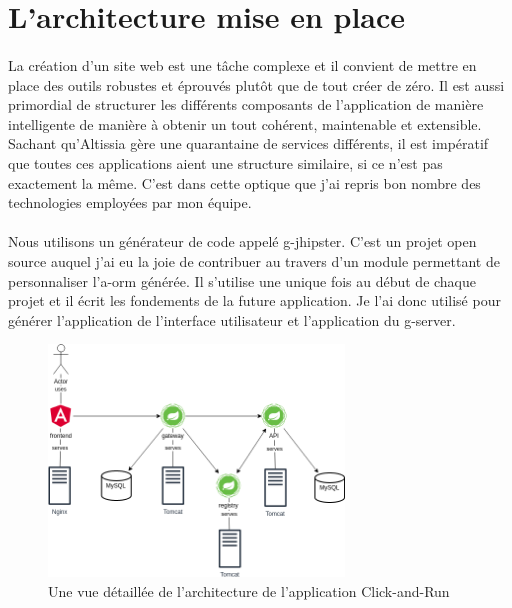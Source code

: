 \section{L'architecture mise en place}
\label{sec:architecture}

\paragraph{}
La création d'un site web est une tâche complexe et il convient de mettre en place des outils robustes et éprouvés plutôt que de tout créer de zéro.
Il est aussi primordial de structurer les différents composants de l'application de manière intelligente de manière à obtenir un tout cohérent, maintenable et extensible.
Sachant qu’Altissia gère une quarantaine de services différents, il est impératif que toutes ces applications aient une structure similaire, si ce n'est pas exactement la même.
C'est dans cette optique que j'ai repris bon nombre des technologies employées par mon équipe.

\paragraph{}
Nous utilisons un générateur de code appelé \gls{g-jhipster}.
C'est un projet open source auquel j'ai eu la joie de contribuer au travers d'un module permettant de personnaliser l'\gls{a-orm} générée\cite{noauthor_generator-jhipster-db-helper_nodate}.
Il s'utilise une unique fois au début de chaque projet et il écrit les fondements de la future application.
Je l'ai donc utilisé pour générer l'application de l'interface utilisateur et l'application du \gls{g-server}.

\begin{figure}[ht]
    \centering
    \includegraphics[width=0.7\textwidth]{images/diagrams/gw-archi-detailed.png}
    \caption{Une vue détaillée de l'architecture de l'application Click-and-Run}
    \label{fig:detailed-archi}
\end{figure}

